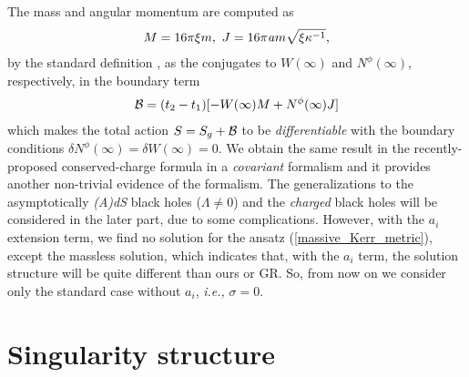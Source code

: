 \documentclass[preprint,aps,tightenlines,showkeys,nofootinbib,superscriptaddress]{revtex4}
\newcommand{\beq}{\begin{eqnarray}}
\newcommand{\eeq}{\end{eqnarray}}
\newcommand{\de}{{\delta}}
\newcommand{\ka}{\kappa}
\newcommand{\La}{{\Lambda}}
\newcommand{\si}{{\sigma}}
\begin{document}
The mass and angular momentum are computed as
\beq
M=16 \pi \xi m, ~ J=16 \pi {\it a} m \sqrt{ \xi \ka^{-1}},
\eeq
by the standard definition \cite{Bana:1992}, as the conjugates to $W(\infty)$ and $N^{\phi} (\infty)$, respectively, in the boundary term
\beq
{\cal B}=(t_2-t_1) [-W(\infty) M+N^{\phi} (\infty) J ]
\eeq
which makes the total action $S=S_g +{\cal B}$ to be {\it differentiable} with the boundary
conditions $\de N^{\phi} (\infty)=\de W(\infty)=0$. We obtain the same result in the
recently-proposed conserved-charge formula in a {\it covariant} formalism
\cite{Deve:2021}
and it provides another non-trivial evidence of the formalism. The generalizations
to the asymptotically {\it (A)dS} black holes ($\La \neq 0$) and the {\it charged} black holes will be
considered in the later part, due to some complications. However, with the $a_i$
extension term, we find
no solution for the ansatz (\ref{massive_Kerr_metric}), except the massless solution, which indicates that, with the $a_i$ term, the solution structure will be quite different than ours or GR. So, from now on we consider only the standard case without $a_i$, {\it i.e.,} $\si=0$.

\section{Singularity structure}
\end{document}
